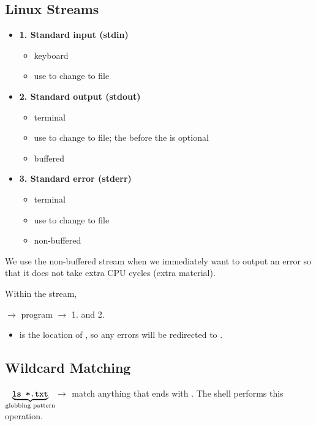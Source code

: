 \subsection{Linux Streams}

\begin{itemize}
      \item \textbf{1. Standard input (stdin)}
            \begin{itemize}
                  \item keyboard
                  \item use \code{<} to change to file
            \end{itemize}
      \item \textbf{2. Standard output (stdout)}
            \begin{itemize}
                  \item terminal
                  \item use  to change to file; the  before the \code{>} is optional
                  \item buffered
            \end{itemize}
      \item \textbf{3. Standard error (stderr)}
            \begin{itemize}
                  \item terminal
                  \item use  to change to file
                  \item non-buffered
            \end{itemize}
\end{itemize}

We use the non-buffered stream when we immediately want to output an error
so that it does not take extra CPU cycles (extra material).

Within the stream,

 $ \rightarrow $ program $ \rightarrow $
1.  and 2. 

\begin{itemize}
      \item {} is the location of , so any errors will be redirected to
            .
\end{itemize}

\subsection{Wildcard Matching}
$ \underbrace{\texttt{ls *.txt}}_{\text{globbing pattern}} \rightarrow{} $
match anything that ends with . The shell performs this operation.

